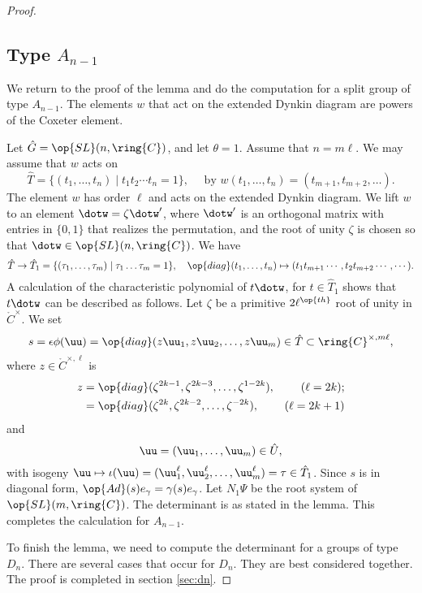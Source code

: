 \begin{proof}
\subsection{Type $A_{n-1}$}
We return to the proof of the lemma and do the computation for a split
group of type $A_{n-1}$.  The elements $w$ that act on the extended
Dynkin diagram are powers of the Coxeter element.

Let $\hat G = \op{SL}(n,\ring{C})$, and let $\theta=1$.  Assume that
$n=m \ell$.  We may assume that $w$ acts on
\[
\hat T = \{(t_1,\ldots,t_{n})\mid t_1t_2\cdots t_{n}=1\},
\quad \text{ by } w(t_1,\ldots,t_{n}) = (t_{m+1},t_{m+2},\ldots).
\]
The element $w$ has order $\ell$ and acts on the extended Dynkin
diagram.  We lift $w$ to an element $\dotw = \zeta \dotw'$, where
$\dotw'$ is an orthogonal matrix with entries in $\{0,1\}$ that
realizes the permutation, and the root of unity $\zeta$ is chosen so
that $\dotw \in \op{SL}(n,\ring{C})$.  We have
\[
\hat T \to \hat T_1 = 
\{(\tau_1,\ldots,\tau_m)\mid \tau_1\ldots\tau_m=1\},
\quad \op{diag}(t_1,\ldots,t_n)
\mapsto (t_1t_{m+1}\cdots,t_2 t_{m+2}\cdots,\cdots).
\]
A calculation of the characteristic polynomial of $t\dotw$, for $t\in
\hat T_1$ shows that $t\dotw$ can be described as follows.  Let
$\zeta$ be a primitive $2\ell^\op{th}$ root of unity in
$\ring{C}^\times$.  We set
\begin{equation}
s=\epsilon\phi(\uu)=\op{diag}(z\uu_1,z\uu_2,\ldots,z\uu_m)
\in \hat T\subset \ring{C}^{\times,m\ell},
\end{equation}
where $z\in \ring{C}^{\times,\ell}$ is
\begin{align*}
z &= \op{diag}(\zeta^{2k-1},\zeta^{2k-3},\ldots,\zeta^{1-2k}), &(\ell=2k);\\
      &= \op{diag}(\zeta^{2k},\zeta^{2k-2},\ldots,\zeta^{-2k}), &(\ell=2k+1)
\end{align*}
and
\[
\uu=(\uu_1,\ldots,\uu_m)\in \hat U,
\]
with isogeny $\uu\mapsto
\iota(\uu)=(\uu_1^\ell,\uu_2^\ell,\ldots,\uu_m^\ell) = \tau\in \hat
T_1$.  Since $s$ is in diagonal form, $\op{Ad}(s) e_\gamma = \gamma(s)
e_\gamma$.  Let $N_1\Psi$ be the root system of $\op{SL}(m,\ring{C})$.
The determinant is as stated in the lemma.  This completes the
calculation for $A_{n-1}$.

To finish the lemma, we need to compute the determinant for a groups
of type $D_n$.  There are several cases that occur for $D_n$.  They
are best considered together.  The proof is completed in section
\ref{sec:dn}.
\end{proof}


